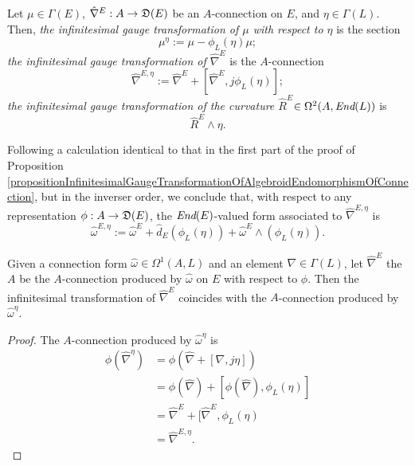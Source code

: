 \begin{definition}\label{definitionInfinitesimalGaugeActionAndTransformationAConnection}
Let $\mu \in \Gamma(E)$, $\hat \nabla^E: A \to \mathfrak{D}(E)$ be an $A$-connection on $E$, and $\eta \in \Gamma(L)$. Then, \emph{the infinitesimal gauge transformation of $\mu$ with respect to $\eta$} is the section
\begin{equation}
    \mu^\eta := \mu - \phi_L(\eta)\mu;
\end{equation}
\emph{the infinitesimal gauge transformation of $\hat \nabla^E$} is the $A$-connection
\begin{equation}
    \hat \nabla^{E, \eta} := \hat \nabla^E + [\hat \nabla^E, j\phi_L(\eta)];
\end{equation}
\emph{the infinitesimal gauge transformation of the curvature $\hat R^E$}$\in \Omega^2(A, \operatorname{\textit{End}}(L))$ is
\begin{equation}
    \hat R^E \wedge \eta.
\end{equation}
\end{definition}

Following a calculation identical to that in the first part of the proof of Proposition \ref{propositionInfinitesimalGaugeTransformationOfAlgebroidEndomorphismOfConnection}, but in the inverser order, we conclude that, with respect to any representation $\phi: A \to \alg D(E)$, the $\operatorname{\textit{End}}(E)$-valued form associated to $\hat \nabla^{E, \eta}$ is
\begin{equation}
    \hat \omega^{E, \eta} := \hat \omega^E + \hat d_E(\phi_L(\eta)) + \hat \omega^E \wedge (\phi_L(\eta)).
\end{equation}

\begin{proposition}\label{propositionGaugeActionTransformationAConnectionEqualToCommute}
Given a connection form $\hat \omega \in \Omega^1(A, L)$ and an element $\nabla \in \Gamma(L)$, let $\hat \nabla^E$ the $A$ be the $A$-connection produced by $\hat \omega$ on $E$ with respect to $\phi$. Then the infinitesimal transformation of $\hat \nabla^E$ coincides with the $A$-connection produced by $\hat \omega^{\eta}$.
\end{proposition}
\begin{proof}
The $A$-connection produced by $\hat \omega^{\eta}$ is
\begin{align*}
    \phi(\hat \nabla^{\eta}) 
        &= \phi(\hat \nabla + [\nabla, j\eta]) \\
        &= \phi(\hat \nabla) + [\phi(\hat \nabla), \phi_L(\eta)]\\
        &= \hat \nabla^E + [\hat \nabla^E, \phi_L(\eta)\\
        &= \hat \nabla^{E, \eta}.
\end{align*}
\end{proof}

